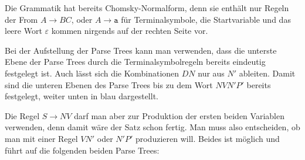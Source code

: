 \begin{loesung}
\begin{teilaufgaben}
\item
Die Grammatik hat bereits Chomsky-Normalform,
denn sie enthält nur Regeln der From $A\to BC$, oder $A\to\texttt{a}$
für Terminalsymbole, die Startvariable und das leere Wort $\varepsilon$
kommen nirgends auf der rechten Seite vor.
\item
Bei der Aufstellung der Parse Trees kann man verwenden, dass die unterste
Ebene der Parse Trees durch die Terminalsymbolregeln bereits eindeutig
festgelegt ist.
Auch lässt sich die Kombinationen $DN$ nur aus $N'$ ableiten.
Damit sind die unteren Ebenen des Parse Trees bis zu dem Wort
$NVN'P'$
bereits festgelegt, weiter unten in {\color{blue}blau} dargestellt.

Die Regel $S\to NV$ darf man aber zur Produktion der ersten beiden Variablen
verwenden, denn damit wäre der Satz schon fertig. 
Man muss also entscheiden, ob man mit einer Regel $VN'$ oder $N'P'$
produzieren will.
Beides ist möglich und führt auf die folgenden beiden Parse Trees:
\begin{center}

\end{center}
\end{teilaufgaben}
\end{loesung}
